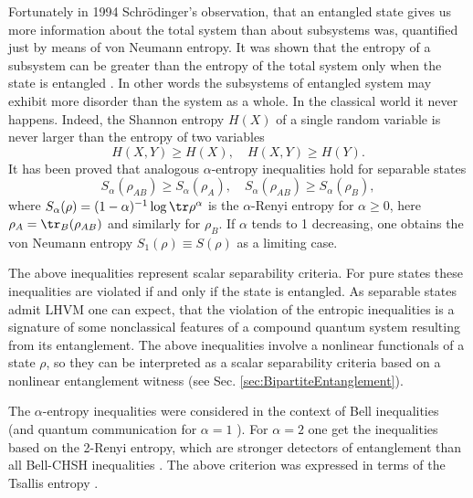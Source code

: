 \documentclass[twocolumn,aps,rmp]{revtex4}
\begin{document}
Fortunately in 1994 Schr{\"o}dinger's observation, that an entangled
state gives us more information about the total system than about
subsystems was, quantified just by means of von Neumann entropy. It
was shown that the entropy of a subsystem can be greater than the
entropy of the total system only when the state is entangled \cite
{RPH1994}. In other words the subsystems of entangled system may
exhibit more disorder than the system as a whole. In the classical
world it never happens. Indeed, the Shannon entropy $H(X)$ of a single
random variable is never larger than the entropy of two variables
\begin{equation}
  H(X,Y)\geq H(X), \quad  H(X,Y)\geq H(Y). \label{H}
\end{equation}
It has been proved \cite {MRH-PRA96,alpha,VollbrechtW,TerhalReview} that analogous
$\alpha$-entropy inequalities hold for separable states
\begin{equation}
S_\alpha(\rho_{AB}) \geq S_\alpha(\rho_A),  \quad S_\alpha(\rho_{AB}) \geq
S_\alpha(\rho_B), \label{ent}
\end{equation}
where $S_\alpha(\rho)= (1-\alpha)^{-1} \log {\tr} \rho^\alpha$ is the
$\alpha$-Renyi entropy for $\alpha \ge 0$, here
$\rho_A={\tr}_B(\rho_{AB})$ and similarly for $\rho_B$. If $\alpha$
tends to 1 decreasing, one obtains the von Neumann entropy
$S_1(\rho)\equiv S(\rho)$ as a limiting case.

The above inequalities represent scalar  separability criteria.
For pure states these inequalities are violated if and only if
the state is entangled. As separable states admit LHVM one can
expect, that the violation of the entropic inequalities is a
signature of some nonclassical features of a compound quantum system
resulting from its entanglement. The above inequalities involve a
nonlinear functionals of a state $\rho$, so they can be interpreted
as a scalar separability criteria based on a nonlinear entanglement
witness (see Sec. \ref{sec:BipartiteEntanglement}).

The $\alpha$-entropy inequalities were considered in the context of
Bell inequalities \cite {MRH-PRA96} (and quantum communication for
$\alpha =1$ \cite{cerfadami}). For $\alpha=2$ one get the inequalities
based on the 2-Renyi entropy, which are stronger detectors of
entanglement than all Bell-CHSH inequalities
\cite{alpha,habil,Santos}. The above criterion was expressed in terms
of the Tsallis entropy \cite {Abe,Tsallis2,Barranco}.
\end{document}
